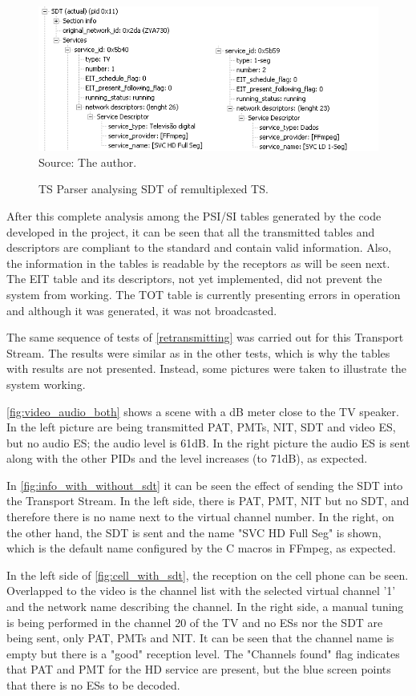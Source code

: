 \documentclass[
	12pt,				%
	openright,			%
	twoside,			%
	a4paper,			%
	brazil,
	french,				%
	english
	]{abntex2}
\begin{document}
\begin{figure}[!h]
\centering
\caption{TS Parser analysing SDT of remultiplexed TS.}
\includegraphics[width=0.9\linewidth]{figuras/ts_parser_tve_remux_sdt.png}
\\Source: The author.
\label{fig:ts_parser_tve_remux_sdt}
\end{figure}

After this complete analysis among the PSI/SI tables generated by the code developed in the project, it can be seen that all the transmitted tables and descriptors are compliant to the standard and contain valid information. Also, the information in the tables is readable by the receptors as will be seen next. The EIT table and its descriptors, not yet implemented, did not prevent the system from working. The TOT table is currently presenting errors in operation and although it was generated, it was not broadcasted.

The same sequence of tests of \autoref{retransmitting} was carried out for this Transport Stream. The results were similar as in the other tests, which is why the tables with results are not presented. Instead, some pictures were taken to illustrate the system working.

\autoref{fig:video_audio_both} shows a scene with a dB meter close to the TV speaker. In the left picture are being transmitted PAT, PMTs, NIT, SDT and video ES, but no audio ES; the audio level is 61dB. In the right picture the audio ES is sent along with the other PIDs and the level increases (to 71dB), as expected.

In \autoref{fig:info_with_without_sdt} it can be seen the effect of sending the SDT into the Transport Stream. In the left side, there is PAT, PMT, NIT but no SDT, and therefore there is no name next to the virtual channel number. In the right, on the other hand, the SDT is sent and the name "SVC HD Full Seg" is shown, which is the default name configured by the C macros in FFmpeg, as expected.

In the left side of \autoref{fig:cell_with_sdt}, the reception on the cell phone can be seen. Overlapped to the video is the channel list with the selected virtual channel '1' and the network name describing the channel. In the right side, a manual tuning is being performed in the channel 20 of the TV and no ESs nor the SDT are being sent, only PAT, PMTs and NIT. It can be seen that the channel name is empty but there is a "good" reception level. The "Channels found" flag indicates that PAT and PMT for the HD service are present, but the blue screen points that there is no ESs to be decoded.
\end{document}

